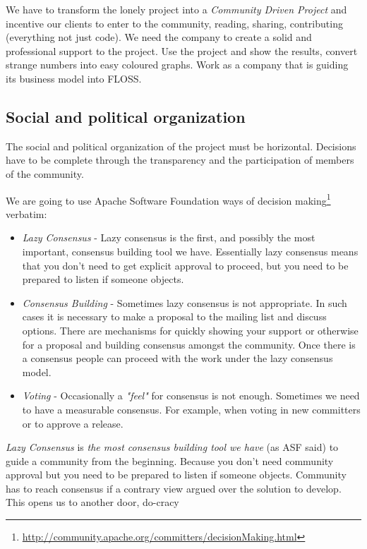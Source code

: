 \documentclass[11pt]{scrartcl}
\begin{document}
\par We have to transform the lonely project into a \emph{Community Driven Project} and incentive our clients to enter to the community, reading, sharing, contributing (everything not just code). We need the company to create a solid and professional support to the project. Use the project and show the results, convert strange numbers into easy coloured graphs. Work as a company that is guiding its business model into FLOSS.


\subsection{Social and political organization}
\label{sub:social-political}

\par The social and political organization of the project must be horizontal. Decisions have to be complete through the transparency and the participation of members of the community.

\par We are going to use Apache Software Foundation ways of decision making\footnote{\url{http://community.apache.org/committers/decisionMaking.html}} verbatim:

\begin{itemize}
	\item \emph{Lazy Consensus} - Lazy consensus is the first, and possibly the most important, consensus building tool we have. Essentially lazy consensus means that you don't need to get explicit approval to proceed, but you need to be prepared to listen if someone objects.

	\item \emph{Consensus Building} - Sometimes lazy consensus is not appropriate. In such cases it is necessary to make a proposal to the mailing list and discuss options. There are mechanisms for quickly showing your support or otherwise for a proposal and building consensus amongst the community. Once there is a consensus people can proceed with the work under the lazy consensus model.

	\item \emph{Voting} - Occasionally a \emph{"feel"} for consensus is not enough. Sometimes we need to have a measurable consensus. For example, when voting in new committers or to approve a release.
\end{itemize}

\par \emph{Lazy Consensus} is \emph{the most consensus building tool we have} (as ASF said) to guide a community from the beginning. Because you don't need community approval but you need to be prepared to listen if someone objects. Community has to reach consensus if a contrary view argued over the solution to develop. This opens us to another door, do-cracy 
\end{document}
